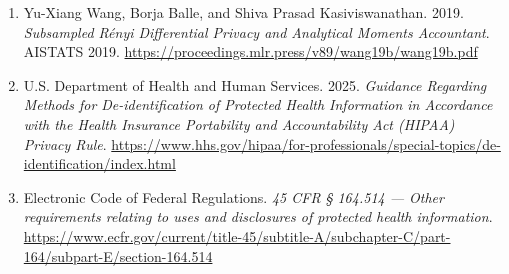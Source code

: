 \begin{enumerate}
  \url{https://arxiv.org/abs/1702.07476}
\item
  Yu-Xiang Wang, Borja Balle, and Shiva Prasad Kasiviswanathan. 2019.
  \emph{Subsampled Rényi Differential Privacy and Analytical Moments
  Accountant}. AISTATS 2019.
  \url{https://proceedings.mlr.press/v89/wang19b/wang19b.pdf}
\item
  U.S. Department of Health and Human Services. 2025. \emph{Guidance
  Regarding Methods for De-identification of Protected Health
  Information in Accordance with the Health Insurance Portability and
  Accountability Act (HIPAA) Privacy Rule}.
  \url{https://www.hhs.gov/hipaa/for-professionals/special-topics/de-identification/index.html}
\item
  Electronic Code of Federal Regulations. \emph{45 CFR § 164.514 ---
  Other requirements relating to uses and disclosures of protected
  health information}.
  \url{https://www.ecfr.gov/current/title-45/subtitle-A/subchapter-C/part-164/subpart-E/section-164.514}
\end{enumerate}
